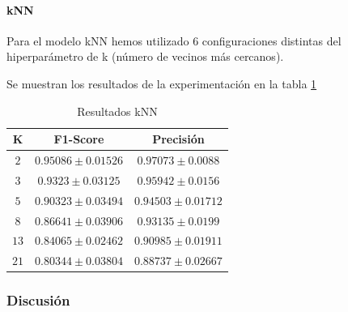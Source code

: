 \documentclass[12pt]{article}
\begin{document}
\paragraph{kNN}
Para el modelo kNN hemos utilizado 6 configuraciones distintas del hiperparámetro de k (número de vecinos más cercanos).

Se muestran los resultados de la experimentación en la tabla \ref{Tab:kNN_2}

\begin{table}[!ht]
	\caption{Resultados kNN}
	\centering
		 \begin{tabular}{||c c c||}
			 \hline
			 K & F1-Score & Precisión  \\ [0.5ex]
			 \hline\hline
			 $2$ & $0.95086 \pm 0.01526$ & $0.97073 \pm 0.0088$ \\
			 \hline
			 $3$ & $0.9323 \pm 0.03125$ & $0.95942 \pm 0.0156$ \\
			 \hline
			 $5$ & $0.90323 \pm 0.03494$ & $0.94503 \pm 0.01712$ \\
			 \hline
			 $8$ & $0.86641 \pm 0.03906$ & $0.93135 \pm 0.0199$ \\
			 \hline
			 $13$ & $0.84065 \pm 0.02462$ & $0.90985 \pm 0.01911$ \\
			 \hline
			 $21$ & $0.80344 \pm 0.03804$ & $0.88737 \pm 0.02667$ \\
			 \hline
		 \end{tabular}
	\label{Tab:kNN_2}
\end{table}

\newpage
\subsubsection{Discusión}

\end{document}

